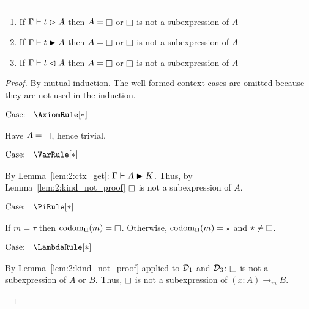 \begin{lemma}
    \textcolor{white}{\_}
    \begin{enumerate}
        \item If $\Gamma \vdash t \vartriangleright A$ then $A = \kind$ or $\kind$ is not a subexpression of $A$
        \item If $\Gamma \vdash t \blacktriangleright A$ then $A = \kind$ or $\kind$ is not a subexpression of $A$
        \item If $\Gamma \vdash t \vartriangleleft A$ then $A = \kind$ or $\kind$ is not a subexpression of $A$
    \end{enumerate}
    \label{lem:2:kind_not_type}
\end{lemma}
\begin{proof}
    By mutual induction.
    The well-formed context cases are omitted because they are not used in the induction.

    $\text{Case: }\begin{array}{c} \AxiomRule[*] \end{array}$
    \begin{proofcase}
        Have $A = \kind$, hence trivial.
    \end{proofcase}

    $\text{Case: }\begin{array}{c} \VarRule[*] \end{array}$
    \begin{proofcase}
        By Lemma~\ref{lem:2:ctx_get}: $\Gamma \vdash A \blacktriangleright K$.
        Thus, by Lemma~\ref{lem:2:kind_not_proof} $\kind$ is not a subexpression of $A$.
    \end{proofcase}

    $\text{Case: }\begin{array}{c} \PiRule[*] \end{array}$
    \begin{proofcase}
        If $m = \tau$ then $\pcodom(m) = \kind$.
        Otherwise, $\mbox{\normalfont codom}_\Pi(m) = \star$ and $\star \neq \kind$.
    \end{proofcase}

    $\text{Case: }\begin{array}{c} \LambdaRule[*] \end{array}$
    \begin{proofcase}
        By Lemma~\ref{lem:2:kind_not_proof} applied to $\mathcal{D}_{1}$ and $\mathcal{D}_{3}$: $\kind$ is not a subexpression of $A$ or $B$.
        Thus, $\kind$ is not a subexpression of $(x : A) \to_m B$.
    \end{proofcase}


\end{proof}
